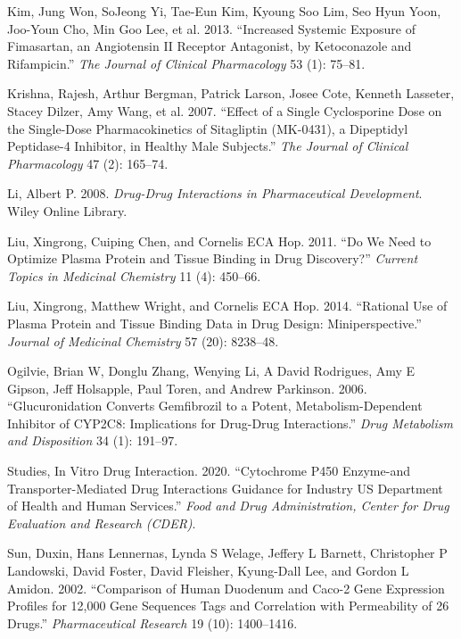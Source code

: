 \documentclass[
  11pt,
  krantz2, a4paper, twoside]{krantz}
\newlength{\cslhangindent}
\newenvironment{CSLReferences}[2] %
 {\begin{list}{}{%
  \setlength{\itemindent}{0pt}
  \setlength{\leftmargin}{0pt}
  \setlength{\parsep}{0pt}
  \ifodd #1
   \setlength{\leftmargin}{\cslhangindent}
   \setlength{\itemindent}{-1\cslhangindent}
  \fi
  \setlength{\itemsep}{#2\baselineskip}}}
 {\end{list}}
\begin{document}
\begin{CSLReferences}{1}{0}
Kim, Jung Won, SoJeong Yi, Tae-Eun Kim, Kyoung Soo Lim, Seo Hyun Yoon, Joo-Youn Cho, Min Goo Lee, et al. 2013. {``Increased Systemic Exposure of Fimasartan, an Angiotensin II Receptor Antagonist, by Ketoconazole and Rifampicin.''} \emph{The Journal of Clinical Pharmacology} 53 (1): 75--81.

Krishna, Rajesh, Arthur Bergman, Patrick Larson, Josee Cote, Kenneth Lasseter, Stacey Dilzer, Amy Wang, et al. 2007. {``Effect of a Single Cyclosporine Dose on the Single-Dose Pharmacokinetics of Sitagliptin (MK-0431), a Dipeptidyl Peptidase-4 Inhibitor, in Healthy Male Subjects.''} \emph{The Journal of Clinical Pharmacology} 47 (2): 165--74.

Li, Albert P. 2008. \emph{Drug-Drug Interactions in Pharmaceutical Development}. Wiley Online Library.

Liu, Xingrong, Cuiping Chen, and Cornelis ECA Hop. 2011. {``Do We Need to Optimize Plasma Protein and Tissue Binding in Drug Discovery?''} \emph{Current Topics in Medicinal Chemistry} 11 (4): 450--66.

Liu, Xingrong, Matthew Wright, and Cornelis ECA Hop. 2014. {``Rational Use of Plasma Protein and Tissue Binding Data in Drug Design: Miniperspective.''} \emph{Journal of Medicinal Chemistry} 57 (20): 8238--48.

Ogilvie, Brian W, Donglu Zhang, Wenying Li, A David Rodrigues, Amy E Gipson, Jeff Holsapple, Paul Toren, and Andrew Parkinson. 2006. {``Glucuronidation Converts Gemfibrozil to a Potent, Metabolism-Dependent Inhibitor of CYP2C8: Implications for Drug-Drug Interactions.''} \emph{Drug Metabolism and Disposition} 34 (1): 191--97.

Studies, In Vitro Drug Interaction. 2020. {``Cytochrome P450 Enzyme-and Transporter-Mediated Drug Interactions Guidance for Industry US Department of Health and Human Services.''} \emph{Food and Drug Administration, Center for Drug Evaluation and Research (CDER)}.

Sun, Duxin, Hans Lennernas, Lynda S Welage, Jeffery L Barnett, Christopher P Landowski, David Foster, David Fleisher, Kyung-Dall Lee, and Gordon L Amidon. 2002. {``Comparison of Human Duodenum and Caco-2 Gene Expression Profiles for 12,000 Gene Sequences Tags and Correlation with Permeability of 26 Drugs.''} \emph{Pharmaceutical Research} 19 (10): 1400--1416.


\end{CSLReferences}
\end{document}
